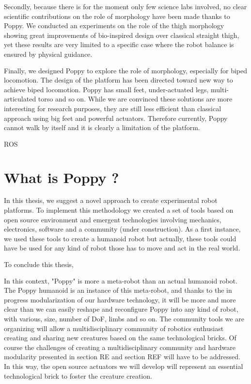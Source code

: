 Secondly, because there is for the moment only few science labs involved, no clear scientific contributions on the role of morphology have been made thanks to Poppy. We conducted an experiments on the role of the thigh morphology showing great improvements of bio-inspired design over classical straight thigh, yet these results are very limited to a specific case where the robot balance is ensured by physical guidance.

Finally, we designed Poppy to explore the role of morphology, especially for biped locomotion. The design of the platform has been directed toward new way to achieve biped locomotion. Poppy has small feet, under-actuated legs, multi-articulated torso and so on. While we are convinced these solutions are more interesting for research purposes, they are still less efficient than classical approach using big feet and powerful actuators.
Therefore currently, Poppy cannot walk by itself and it is clearly a limitation of the platform.


ROS


\section{What is Poppy ?} %
\label{sec:what_is_poppy}


In this thesis, we suggest a novel approach to create experimental robot platforms. To implement this methodology we created a set of tools based on open source environment and emergent technologies involving mechanics, electronics, software and a community (under construction). As a first instance, we used these tools to create a humanoid robot but actually, these tools could have be used for any kind of robot those has to move and act in the real world.

To conclude this thesis,

In this context, "Poppy" is more a meta-robot than an actual humanoid robot. The Poppy humanoid is an instance of this meta-robot, and thanks to the in progress modularization of our hardware technology, it will be more and more clear than we can easily reshape and reconfigure Poppy into any kind of robot, with various, size, number of DoF, limbs and so on. The community tools we are organizing will allow a multidisciplinary community of robotics enthusiast creating and sharing new creatures based on the same technological bricks. Of course the challenges of creating a multidisciplinary community and hardware modularity presented in section RE and section REF will have to be addressed. In this way, the open source actuators we will develop will represent an essential technological brick to foster the creature creation.


